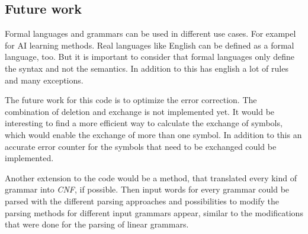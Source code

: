 \documentclass[a4paper, 11pt]{article}
\begin{document}
\subsection{Future work}

Formal languages and grammars can be used in different use cases. For exampel for AI learning methods. Real languages like English can be defined as a formal language, too. But it is important to consider that formal languages only define the syntax and not the semantics. In addition to this has english a lot of rules and many exceptions. \cite{FG}

The future work for this code is to optimize the error correction. The combination of deletion and exchange is not implemented yet. It would be interesting to find a more efficient way to calculate the exchange of symbols, which would enable the exchange of more than one symbol.
In addition to this an accurate error counter for the symbols that need to be exchanged could be implemented.

Another extension to the code would be a method, that translated every kind of grammar into \textit{CNF}, if possible. Then input words for every grammar could be parsed with the different parsing approaches and possibilities to modify the parsing methods for different input grammars appear, similar to the modifications that were done for the parsing of linear grammars.




\newpage











\newpage

\fancyhead[LO]{\empty}
\end{document}
